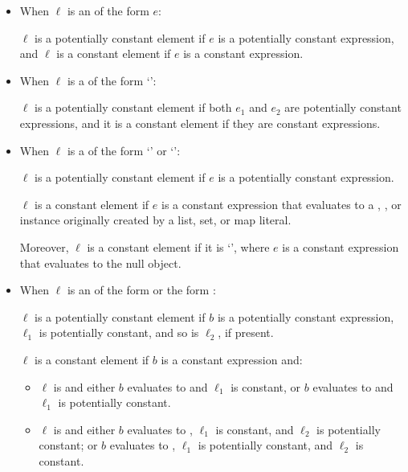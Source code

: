 \documentclass[makeidx]{article}
\begin{document}
{\begin{itemize}
\item
  When $\ell$ is an  of the form $e$:

  $\ell$ is a potentially constant element
  if $e$ is a potentially constant expression,
  and $\ell$ is a constant element
  if $e$ is a constant expression.
\item
  When $\ell$ is a 
  of the form `':

  $\ell$ is a potentially constant element
  if both $e_1$ and $e_2$ are potentially constant expressions,
  and it is a constant element if they are constant expressions.
\item
  When $\ell$ is a 
  of the form `' or `':

  $\ell$ is a potentially constant element
  if $e$ is a potentially constant expression.

  $\ell$ is a constant element
  if $e$ is a constant expression that evaluates
  to a , , or  instance
  originally created by a list, set, or map literal.

  Moreover, $\ell$ is a constant element if it is `',
  where $e$ is a constant expression that evaluates
  to the null object.
\item
  When $\ell$ is an 
  of the form
  or the form
  :

  $\ell$ is a potentially constant element
  if $b$ is a potentially constant expression,
  $\ell_1$ is potentially constant,
  and so is $\ell_2$, if present.

  $\ell$ is a constant element if $b$ is a constant expression
  and:

  \begin{itemize}
  \item
    $\ell$ is  and
    either $b$ evaluates to \TRUE{} and $\ell_1$ is constant,
    or $b$ evaluates to \FALSE{} and $\ell_1$ is potentially constant.
  \item
    $\ell$ is  and
    either $b$ evaluates to \TRUE,
    $\ell_1$ is constant,
    and $\ell_2$ is potentially constant;
    or $b$ evaluates to \FALSE,
    $\ell_1$ is potentially constant,
    and $\ell_2$ is constant.
  \end{itemize}
\end{itemize}

}
\end{document}
